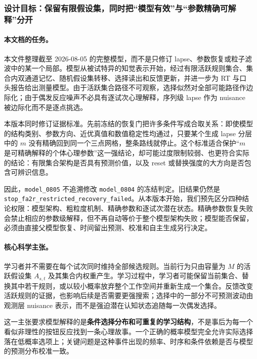 
\subsubsection{设计目标：保留有限假设集，同时把“模型有效”与“参数精确可解释”分开}

\paragraph{本文档的任务。}
本文件整理截至 2026-08-05 的完整模型，而不是只修订 lapse、参数恢复或粒子滤波中的某一个局部。模型从被试特异的知觉表示开始，经过有限活跃规则集合、集合内双通道记忆、随机假设集转移、选择读出和反馈更新，并进一步为 RT 与口头报告给出测量模型。由于活跃集合路径不可观察，选择似然对全部可能路径作边际化；由于偶发反应噪声不必具有逐试次心理解释，序列级 lapse 作为 nuisance 被边际化而不是逐点挑选。

本版本同时修订证据标准。先前冻结的恢复门把许多条件写成合取关系：即使模型的结构类别、参数方向、近优真值和数值稳定性均通过，只要某个生成 lapse 分层中的 $m$ 没有精确回到同一个三点网格，整条路线就停止。这个标准适合保护“$m$ 是可精确解释的个体心理参数”这一强结论，却可能过度限制较弱、也更符合实际的结论：有限集合架构是否具有预测价值，以及 reset 或替换强度的大方向是否包含可辨识信息。

因此，\texttt{model\_0805} 不追溯修改 \texttt{model\_0804} 的冻结判定。旧结果仍然是 \texttt{stop\_fa2r\_restricted\_recovery\_failed}。从本版本开始，我们预先区分四种结论权限：模型架构、粗粒度机制、精确参数和逐试次潜在状态。精确参数恢复失败会禁止相应的参数级解释，但不再自动等价于整个模型架构失败；模型能否保留，必须由直接父模型恢复、时间留出预测、校准和自主生成另行决定。

\paragraph{核心科学主张。}
学习者并不需要在每个试次同时维持全部候选规则。当前行为只由容量为 $M$ 的活跃假设集 $A_{s,t}$ 及其集合内权重产生。学习过程中，学习者可能保留当前集合、替换其中若干规则，或以较小概率放弃整个工作空间并重新生成一个集合。反馈改变活跃规则的证据，也影响后续是否需要更强搜索；选择中的一部分不可预测波动由观测层 nuisance 表示，而不是强迫潜在认知状态追随每一次偶发选择。

这一主张要求模型解释的是\textbf{条件选择分布和可重复的学习结构}，不是事后为每一个看似非理性的按钮反应找到一条心理故事。一个正确的概率模型完全允许实际选择落在低概率选项上；关键问题是这种事件出现的频率、时序和条件依赖是否与模型的预测分布校准一致。

